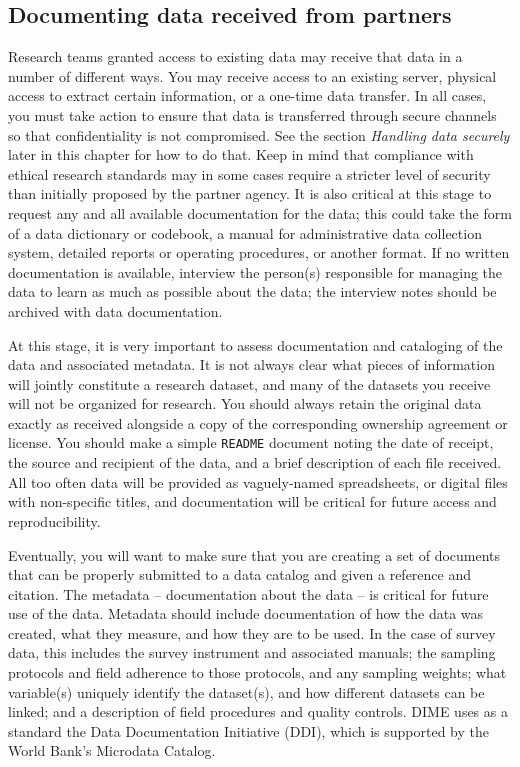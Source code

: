 \subsection{Documenting data received from partners	}

Research teams granted access to existing data may receive that data in a number of different ways.
You may receive access to an existing server,
physical access to extract certain information,
or a one-time data transfer.
In all cases, you must take action to ensure
that data is transferred through
secure channels so that confidentiality is not compromised.
See the section \textit{Handling data securely} later in this chapter for how to do that.
Keep in mind that compliance with ethical research standards may
in some cases require a stricter level of security than initially proposed by the partner agency.
It is also critical at this stage to request any and all available documentation for the data;
this could take the form of a data dictionary or codebook,
a manual for administrative data collection system, detailed reports or operating procedures,
or another format.
If no written documentation is available,
interview the person(s) responsible for managing the data
to learn as much as possible about the data;
the interview notes should be archived with data documentation.

At this stage, it is very important to assess
documentation and cataloging of the data and associated metadata.
It is not always clear what pieces of information will jointly constitute a research dataset,
and many of the datasets you receive will not be organized for research.
You should always retain the original data exactly as received
alongside a copy of the corresponding ownership agreement or license.
You should make a simple \texttt{README} document noting the date of receipt,
the source and recipient of the data,
and a brief description of each file received.
All too often data will be provided as vaguely-named spreadsheets,
or digital files with non-specific titles,
and documentation will be critical for future access and reproducibility.

Eventually, you will want to make sure that you are creating a set of documents
that can be properly submitted to a data catalog and given a reference and citation.
The metadata -- documentation about the data -- is critical for future use of the data.
Metadata should include documentation of how the data was created,
what they measure, and how they are to be used.
In the case of survey data, this includes the survey instrument and associated manuals;
the sampling protocols and field adherence to those protocols, and any sampling weights;
what variable(s) uniquely identify the dataset(s), and how different datasets can be linked;
and a description of field procedures and quality controls.
DIME uses as a standard the Data Documentation Initiative (DDI), which is supported by the
World Bank's Microdata Catalog.

